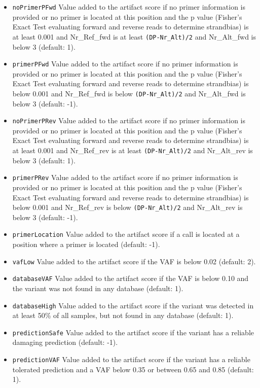 \documentclass{article}
\begin{document}
\begin{itemize}
  \item \texttt{noPrimerPFwd} Value added to the artifact score if no primer information is provided or no primer is located at this position and the p value (Fisher's Exact Test evaluating forward and reverse reads to determine strandbias) is at least 0.001 and Nr\_Ref\_fwd is at least \texttt{(DP-Nr\_Alt)/2} and Nr\_Alt\_fwd is below 3 (default: 1).
  \item \texttt{primerPFwd} Value added to the artifact score if no primer information is provided or no primer is located at this position and the p value (Fisher's Exact Test evaluating forward and reverse reads to determine strandbias) is below 0.001 and Nr\_Ref\_fwd is below \texttt{(DP-Nr\_Alt)/2} and Nr\_Alt\_fwd is below 3 (default: -1).
  \item \texttt{noPrimerPRev} Value added to the artifact score if no primer information is provided or no primer is located at this position and the p value (Fisher's Exact Test evaluating forward and reverse reads to determine strandbias) is at least 0.001 and Nr\_Ref\_rev is at least \texttt{(DP-Nr\_Alt)/2} and Nr\_Alt\_rev is below 3 (default: 1).
  \item \texttt{primerPRev} Value added to the artifact score if no primer information is provided or no primer is located at this position and the p value (Fisher's Exact Test evaluating forward and reverse reads to determine strandbias) is below 0.001 and Nr\_Ref\_rev is below \texttt{(DP-Nr\_Alt)/2} and Nr\_Alt\_rev is below 3 (default: -1).
  \item \texttt{primerLocation} Value added to the artifact score if a call is located at a position where a primer is located (default: -1).
  \item \texttt{vafLow} Value added to the artifact score if the VAF is below 0.02 (default: 2).
  \item \texttt{databaseVAF} Value added to the artifact score if the VAF is below 0.10 and the variant was not found in any database (default: 1).
  \item \texttt{databaseHigh} Value added to the artifact score if the variant was detected in at least 50\% of all samples, but not found in any database (default: 1).
  \item \texttt{predictionSafe} Value added to the artifact score if the variant has a reliable damaging prediction (default: -1).
  \item \texttt{predictionVAF} Value added to the artifact score if the variant has a reliable tolerated prediction and a VAF below 0.35 or between 0.65 and 0.85 (default: 1).

\end{itemize}
\end{document}
